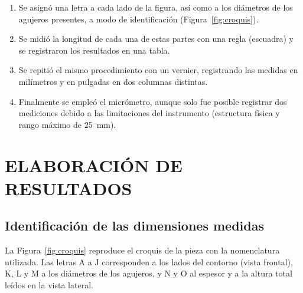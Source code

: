 \documentclass[12pt,a4paper]{article}
\begin{document}
\begin{enumerate}[label=\textbf{\arabic*.}]
	\item Se asignó una letra a cada lado de la figura, así como a los diámetros
	      de los agujeros presentes, a modo de identificación
	      (Figura~\ref{fig:croquis}).
	\item Se midió la longitud de cada una de estas partes con una regla
	      (escuadra) y se registraron los resultados en una tabla.
	\item Se repitió el mismo procedimiento con un vernier, registrando las
	      medidas en milímetros y en pulgadas en dos columnas distintas.
	\item Finalmente se empleó el micrómetro, aunque solo fue posible registrar
	      dos mediciones debido a las limitaciones del instrumento (estructura
	      física y
	      rango máximo de \SI{25}{\milli\metre}).
\end{enumerate}

\section{ELABORACIÓN DE RESULTADOS}\label{sec:resultados}

\subsection{Identificación de las dimensiones medidas}

La Figura~\ref{fig:croquis} reproduce el croquis de la pieza con la nomenclatura
utilizada. Las letras A a J corresponden a los lados del contorno (vista
frontal), K, L y M a los diámetros de los agujeros, y N y O al espesor y a la
altura total leídos en la vista lateral.
\end{document}
